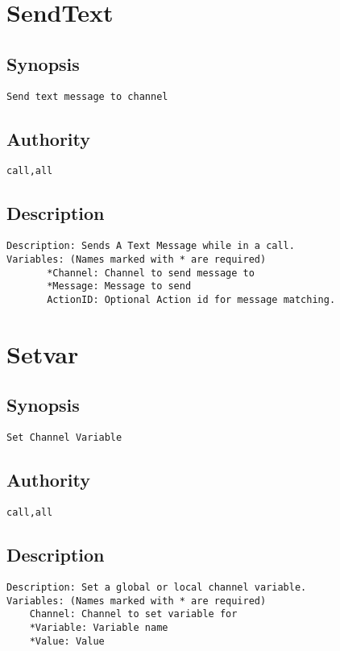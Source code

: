 \section{SendText}
\subsection{Synopsis}
\begin{verbatim}
Send text message to channel
\end{verbatim}
\subsection{Authority}
\begin{verbatim}
call,all
\end{verbatim}
\subsection{Description}
\begin{verbatim}
Description: Sends A Text Message while in a call.
Variables: (Names marked with * are required)
       *Channel: Channel to send message to
       *Message: Message to send
       ActionID: Optional Action id for message matching.

\end{verbatim}


\section{Setvar}
\subsection{Synopsis}
\begin{verbatim}
Set Channel Variable
\end{verbatim}
\subsection{Authority}
\begin{verbatim}
call,all
\end{verbatim}
\subsection{Description}
\begin{verbatim}
Description: Set a global or local channel variable.
Variables: (Names marked with * are required)
	Channel: Channel to set variable for
	*Variable: Variable name
	*Value: Value

\end{verbatim}


